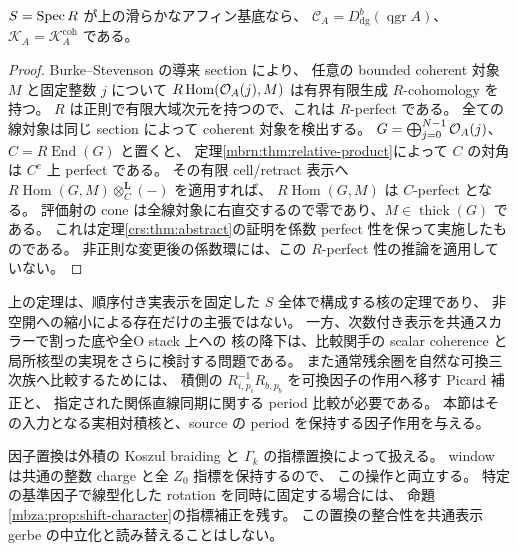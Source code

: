 \begin{corollary}
\label{mbrn:cor:regular-coherent}
$S=\operatorname{Spec} R$ が上の滑らかなアフィン基底なら、
$\mathscr C_A=D^b_{\mathrm{dg}}(\operatorname{qgr}A)$、
$\mathscr K_A=\mathcal K_A^{\mathrm{coh}}$ である。
\end{corollary}
\begin{proof}
Burke--Stevenson の導来 section により、
任意の bounded coherent 対象 $M$ と固定整数 $j$ について
$R\operatorname{Hom}(\mathcal O_A(j),M)$ は有界有限生成 $R$-cohomology を持つ。
$R$ は正則で有限大域次元を持つので、これは $R$-perfect である。
全ての線対象は同じ section によって coherent 対象を検出する。
$G=\bigoplus_{j=0}^{N-1}\mathcal O_A(j)$、$C=R\operatorname{End}(G)$ と置くと、
定理\ref{mbrn:thm:relative-product}によって $C$ の対角は $C^e$ 上 perfect である。
その有限 cell/retract 表示へ
$R\operatorname{Hom}(G,M)\otimes_C^{\mathbf L}(-)$ を適用すれば、
$R\operatorname{Hom}(G,M)$ は $C$-perfect となる。
評価射の cone は全線対象に右直交するので零であり、$M\in\operatorname{thick}(G)$ である。
これは定理\ref{crs:thm:abstract}の証明を係数 perfect 性を保って実施したものである。
非正則な変更後の係数環には、この $R$-perfect 性の推論を適用していない。
\end{proof}

\begin{remark}
\label{mbrn:rem:scope}
上の定理は、順序付き実表示を固定した $S$ 全体で構成する核の定理であり、
非空開への縮小による存在だけの主張ではない。
一方、次数付き表示を共通スカラーで割った底や全O stack 上への
核の降下は、比較関手の scalar coherence と局所核型の実現をさらに検討する問題である。
また通常残余圏を自然な可換三次族へ比較するためには、
積側の $R_{i,p_i}^{-1}R_{b,p_b}$ を可換因子の作用へ移す Picard 補正と、
指定された関係直線同期に関する period 比較が必要である。
本節はその入力となる実相対積核と、source の period を保持する因子作用を与える。

因子置換は外積の Koszul braiding と $\Gamma_k$ の指標置換によって扱える。
window は共通の整数 charge と全 $Z_0$ 指標を保持するので、
この操作と両立する。
特定の基準因子で線型化した rotation を同時に固定する場合には、
命題\ref{mbza:prop:shift-character}の指標補正を残す。
この置換の整合性を共通表示 gerbe の中立化と読み替えることはしない。
\end{remark}
